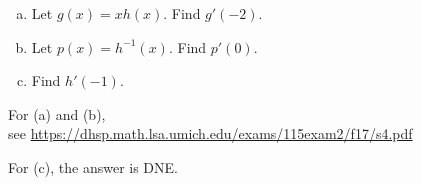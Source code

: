 \documentclass[11pt]{exam}
\begin{document}
\begin{questions}
\begin{minipage}{0.5\linewidth}
\begin{enumerate}[(a)]
            \item Let $g(x) = xh(x)$. Find $g'(-2)$.
            \item Let $p(x) = h^{-1}(x)$. Find $p'(0)$.
            \item Find $h'(-1)$.
            \end{enumerate}
        \end{minipage}
        \begin{solution}
          For (a) and (b),\\ see \href{https://dhsp.math.lsa.umich.edu/exams/115exam2/f17/s4.pdf}{https://dhsp.math.lsa.umich.edu/exams/115exam2/f17/s4.pdf}

          For (c), the answer is DNE.
        \end{solution}
\end{questions}
\end{document}
